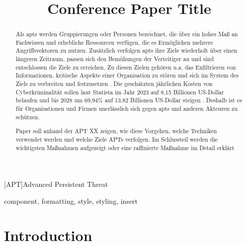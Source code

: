 \documentclass[conference]{IEEEtran}
\begin{document}
\begin{acronym}
    [APT]{Advanced Persistent Threat}
\end{acronym}


\title{Conference Paper Title
}

\author{
}

\maketitle

\begin{abstract}
    Als \acp{apt} werden Gruppierungen oder Personen bezeichnet, die über ein hohes Maß an Fachwissen und erhebliche Ressourcen verfügen, die es Ermöglichen mehrere Angriffsvektoren zu nutzen.
    Zusätzlich verfolgen \acp{apt} ihre Ziele wiederholt über einen längeren Zeitraum, passen sich den Bemühungen der Verteitiger an und sind entschlossen die Ziele zu erreichen.
    Zu diesen Zielen gehören u.\nobreakspace a. das Exfiltrieren von Informationen, kritische Aspekte einer Organisation zu stören und sich im System des Ziels zu verbreiten und festzusetzen \cite[S.~B-1]{NIST2011}.
    Die geschätzten jährlichen Kosten von Cyberkriminalität sollen laut Statista im Jahr 2023 auf 8,15 Billionen US-Dollar belaufen und bis 2028 um 69,94\% auf 13.82 Billionen US-Dollar steigen \cite{Statista2023}.
    Deshalb ist es für Organisationen und Firmen unerlässlich sich gegen \acp{apt} und anderen Akteuren zu schützen.

    Paper soll anhand der APT XX zeigen, wie diese Vorgehen, welche Techniken verwendet werden und welche Ziele APTs verfolgen.
    Im Schlussteil werden die wichtigsten Maßnahmen aufgezeigt oder eine raffinierte Maßnahme im Detail erklärt
\end{abstract}

\begin{IEEEkeywords}
    component, formatting, style, styling, insert
\end{IEEEkeywords}

\section{Introduction}
\end{document}
